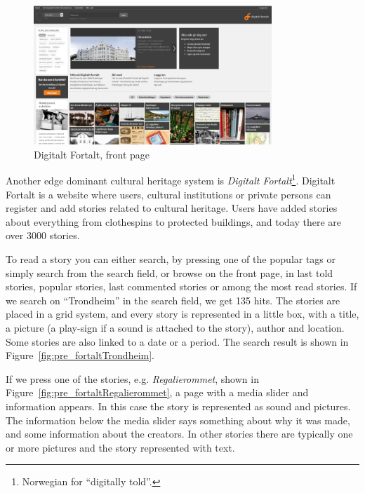 \documentclass[11pt]{book}
\begin{document}
\begin{figure}[H]
      \centering
      \includegraphics[width=0.8\textwidth]{Figures/Prestudy/digitaltfortaltForside.png}
      \caption{Digitalt Fortalt, front page}
      \label{fig:pre_fortaltFrontPage}
\end{figure}

Another edge dominant cultural heritage system is \emph{Digitalt Fortalt}\footnote{Norwegian for ``digitally told''.}. Digitalt Fortalt is a website where users, cultural institutions or private persons can register and add stories related to cultural heritage. Users have added stories about everything from clothespins to protected buildings, and today there are over 3000 stories. 

To read a story you can either search, by pressing one of the popular tags or simply search from the search field, or browse on the front page, in last told stories, popular stories, last commented stories or among the most  read stories. If we search on ``Trondheim'' in the search field, we get 135 hits. The stories are placed in a grid system, and every story is represented in a little box, with a title, a picture (a play-sign if a sound is attached to the story), author and location. Some stories are also linked to a date or a period. The search result is shown in Figure~\ref{fig:pre_fortaltTrondheim}.

If we press one of the stories, e.g. \emph{Regalierommet}, shown in Figure~\ref{fig:pre_fortaltRegalierommet}, a page with a media slider and information appears. In this case the story is represented as sound and pictures. The information below the media slider says something about why it was made, and some information about the creators. In other stories there are typically one or more pictures and the story represented with text.
\end{document}
